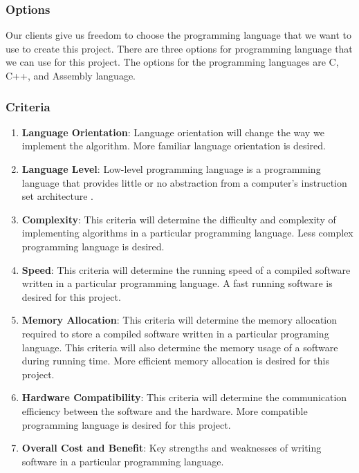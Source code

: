 \subsubsection{Options}
Our clients give us freedom to choose the programming language that we want to use to create this project.
There are three options for programming language that we can use for this project.
The options for the programming languages are C, C++, and Assembly language.\\

\subsubsection{Criteria}
\begin{enumerate}
	\item \textbf{Language Orientation}: Language orientation will change the way we implement the algorithm. More familiar language orientation is desired. 
	\item \textbf{Language Level}: Low-level programming language is a programming language that provides little or no abstraction from a computer's instruction set architecture \cite{low}. 
	\item \textbf{Complexity}: This criteria will determine the difficulty and complexity of implementing algorithms in a particular programming language. Less complex programming language is desired.
	\item \textbf{Speed}: This criteria will determine the running speed of a compiled software written in a particular programming language. A fast running software is desired for this project. 
	\item \textbf{Memory Allocation}: This criteria will determine the memory allocation required to store a compiled software written in a particular programing language. This criteria will also determine the memory usage of a software during running time. More efficient memory allocation is desired for this project. 
	\item \textbf{Hardware Compatibility}: This criteria will determine the communication efficiency between the software and the hardware. More compatible programming language is desired for this project. 
	\item \textbf{Overall Cost and Benefit}: Key strengths and weaknesses of writing software in a particular programming language.\\
\end{enumerate}

